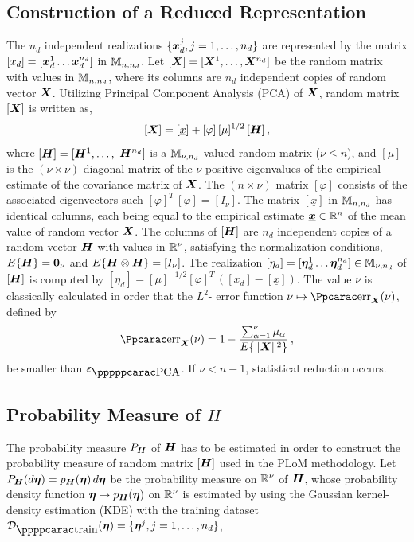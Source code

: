 \subsection{Construction of a Reduced Representation}
\label{sec:PLoM.1}
%
The $n_d$ independent realizations $\{{\boldsymbol{x}}_d^j , j=1,\ldots , n_d\}$ are represented by the matrix $[x_d]= [{\boldsymbol{x}}_d^1 \ldots {\boldsymbol{x}}_d^{n_d}]$ in ${\mathbb{M}}_{n,n_d}$. Let $[{\boldsymbol{X}}]= [{\boldsymbol{X}}^1,\ldots ,{\boldsymbol{X}}^{n_d}]$ be the random matrix with values in ${\mathbb{M}}_{n,n_d}$, where its columns are $n_d$ independent copies of random vector ${\boldsymbol{X}}$. Utilizing Principal Component Analysis (PCA) of ${\boldsymbol{X}}$, random matrix $[{\boldsymbol{X}}]$ is written as,
%
\begin{equation}\label{eqPLoM1}
[{\boldsymbol{X}}] = [\underline x] + [\varphi]\, [\mu]^{1/2}\, [{\boldsymbol{H}}]\, ,
\end{equation}
%
where $[{\boldsymbol{H}}] = [{\boldsymbol{H}}^1,\ldots ,$ ${\boldsymbol{H}}^{n_d}]$ is a ${\mathbb{M}}_{\nu,n_d}$-valued random matrix ($\nu\leq n$), and $[\mu]$ is the $(\nu\times\nu)$ diagonal matrix of the $\nu$ positive eigenvalues of the empirical estimate of the covariance matrix of ${\boldsymbol{X}}$. The $(n\times\nu)$ matrix $[\varphi]$ consists of the associated eigenvectors such $[\varphi]^T\,[\varphi]= [I_{\nu}]$. The matrix $[\underline x]$ in ${\mathbb{M}}_{n,n_d}$ has identical columns, each being equal to the empirical estimate $\underline{{\boldsymbol{x}}}\in{\mathbb{R}}^{n}$ of the mean value of random vector ${\boldsymbol{X}}$. The columns of $[{\boldsymbol{H}}]$ are $n_d$ independent copies of a random vector ${\boldsymbol{H}}$ with values in ${\mathbb{R}}^{\nu}$, satisfying the normalization conditions, $E\{{\boldsymbol{H}}\}={ \hbox{\bf 0} }_\nu$ and $E\{{\boldsymbol{H}}\otimes {\boldsymbol{H}}\}= [I_\nu]$. The realization $[\eta_d] = [{\boldsymbol{\eta}}^{1}_d \ldots {\boldsymbol{\eta}}^{n_d}_d] \in {\mathbb{M}}_{\nu,n_d}$ of $[{\boldsymbol{H}}]$  is computed by $[\eta_d] =  [\mu]^{-1/2} [\varphi]^T\, ([x_d] - [\underline x])$. The value $\nu$ is classically calculated in order that the $L^2$- error function $\nu\mapsto \err_\bfX(\nu)$, defined by
\begin{equation}\label{eqPLoM2}
\err_\bfX(\nu) = 1 - \frac{\sum_{\alpha=1}^\nu \mu_\alpha}{E\{\Vert\bfX\Vert^2\}} \, ,
\end{equation}
%
be smaller than $\varepsilon_\PCA$. If $\nu < n-1$, statistical reduction occurs.

\subsection{Probability Measure of $H$}
\label{sec:PLoM.2}

The probability measure $P_{\boldsymbol{H}}$ of ${\boldsymbol{H}}$ has to be estimated in order to construct the probability measure of random matrix $[{\boldsymbol{H}}]$ used in the PLoM methodology. Let $P_{\boldsymbol{H}}(d{\boldsymbol{\eta}}) = p_{\boldsymbol{H}}({\boldsymbol{\eta}})\, d{\boldsymbol{\eta}}$ be the probability measure on ${\mathbb{R}}^\nu$ of ${\boldsymbol{H}}$, whose probability density function ${\boldsymbol{\eta}}\mapsto p_{\boldsymbol{H}}({\boldsymbol{\eta}})$ on ${\mathbb{R}}^\nu$ is estimated by using the Gaussian kernel-density estimation (KDE) with the training dataset $\curD_\ptraining(\bfeta) = \{\bfeta^j,j=1,\ldots,n_d\}$,

